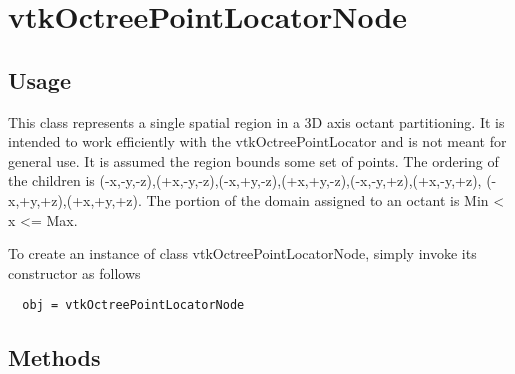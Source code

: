 \section{vtkOctreePointLocatorNode}

\subsection{Usage}

 This class represents a single spatial region in a 3D axis octant 
 partitioning.  It is intended to work efficiently with the 
 vtkOctreePointLocator and is not meant for general use.  It is assumed 
 the region bounds some set of points.  The ordering of the children is 
 (-x,-y,-z),(+x,-y,-z),(-x,+y,-z),(+x,+y,-z),(-x,-y,+z),(+x,-y,+z),
 (-x,+y,+z),(+x,+y,+z).  The portion of the domain assigned to an 
 octant is Min < x <= Max.  
    

To create an instance of class vtkOctreePointLocatorNode, simply
invoke its constructor as follows
\begin{verbatim}
  obj = vtkOctreePointLocatorNode
\end{verbatim}
\subsection{Methods}

